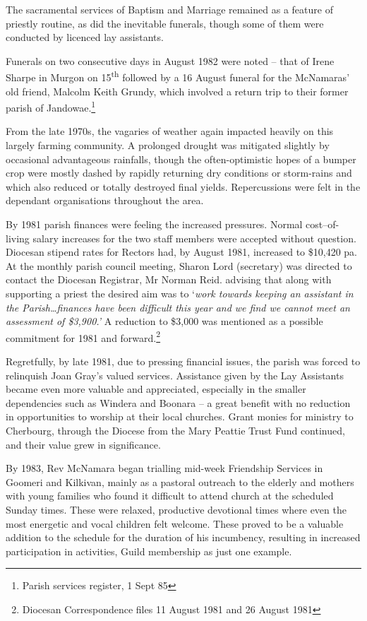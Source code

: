 The sacramental services of Baptism and Marriage remained as a feature of priestly routine, as did the inevitable funerals, though some of them were conducted by licenced lay assistants.



Funerals on two consecutive days in August 1982 were noted -- that of Irene Sharpe in Murgon on 15\textsuperscript{th} followed by a 16 August funeral for the McNamaras' old friend, Malcolm Keith Grundy, which involved a return trip to their former parish of Jandowae.\footnote{Parish services register, 1 Sept 85}


From the late 1970s, the vagaries of weather again impacted heavily on this largely farming community. A prolonged drought was mitigated slightly by occasional advantageous rainfalls, though the often-optimistic hopes of a bumper crop were mostly dashed by rapidly returning dry conditions or storm-rains and which also reduced or totally destroyed final yields. Repercussions were felt in the dependant organisations throughout the area.



By 1981 parish finances were feeling the increased pressures. Normal cost--of-living salary increases for the two staff members were accepted without question. Diocesan stipend rates for Rectors had, by August 1981, increased to \$10,420 pa. At the monthly parish council meeting, Sharon Lord (secretary) was directed to contact the Diocesan Registrar, Mr Norman Reid. advising that along with supporting a priest the desired aim was to `\emph{work towards keeping an assistant in the Parish\ldots finances have been difficult this year and we find we cannot meet an assessment of \$3,900.'} A reduction to \$3,000 was mentioned as a possible commitment for 1981 and forward.\footnote{Diocesan Correspondence files 11 August 1981 and 26 August 1981}


Regretfully, by late 1981, due to pressing financial issues, the parish was forced to relinquish Joan Gray's valued services. Assistance given by the Lay Assistants became even more valuable and appreciated, especially in the smaller dependencies such as Windera and Boonara -- a great benefit with no reduction in opportunities to worship at their local churches. Grant monies for ministry to Cherbourg, through the Diocese from the Mary Peattie Trust Fund continued, and their value grew in significance.



By 1983, Rev McNamara began trialling mid-week Friendship Services in Goomeri and Kilkivan, mainly as a pastoral outreach to the elderly and mothers with young families who found it difficult to attend church at the scheduled Sunday times. These were relaxed, productive devotional times where even the most energetic and vocal children felt welcome. These proved to be a valuable addition to the schedule for the duration of his incumbency, resulting in increased participation in activities, Guild membership as just one example.



